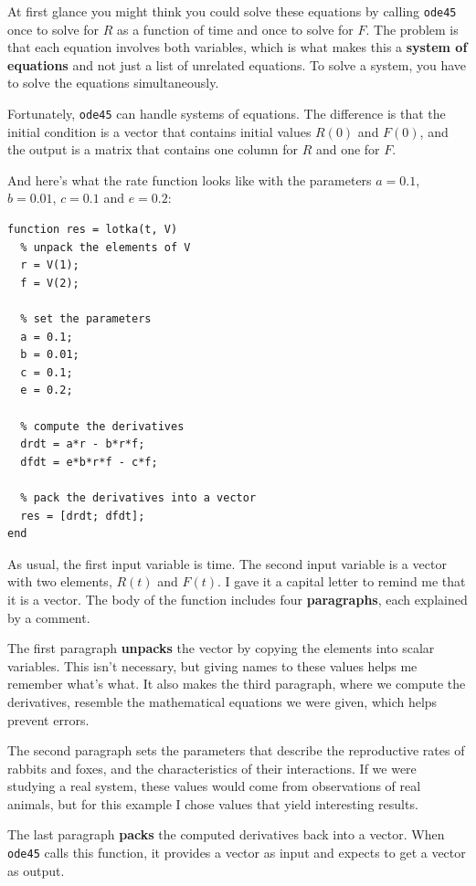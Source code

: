 \documentclass{book}
\begin{document}
At first glance you might think you could solve these equations by
calling {\tt ode45} once to solve for $R$ as a function of time and
once to solve for $F$. The problem is that each equation involves
both variables, which is what makes this a {\bf system of equations}
and not just a list of unrelated equations. To solve a system, you
have to solve the equations simultaneously.

Fortunately, {\tt ode45} can handle systems of equations. The
difference is that the initial condition is a vector that contains
initial values $R(0)$ and $F(0)$, and the output is a matrix
that contains one column for $R$ and one for $F$.

And here's what the rate function looks like
with the parameters $a = 0.1$, $b = 0.01$, $c = 0.1$ and $e = 0.2$:

\begin{verbatim}
function res = lotka(t, V)
  % unpack the elements of V
  r = V(1);
  f = V(2);

  % set the parameters
  a = 0.1;
  b = 0.01;
  c = 0.1;
  e = 0.2;
  
  % compute the derivatives
  drdt = a*r - b*r*f;
  dfdt = e*b*r*f - c*f;
  
  % pack the derivatives into a vector
  res = [drdt; dfdt];
end
\end{verbatim}

As usual, the first input variable is time.
The second input variable is a vector with two elements,
$R(t)$ and $F(t)$. I gave it a capital letter to remind me that it
is a vector. The body of the function includes four {\bf paragraphs},
each explained by a comment.

The first paragraph {\bf unpacks} the vector by copying the elements
into scalar variables. This isn't necessary, but giving names to
these values helps me remember what's what. It also makes the third
paragraph, where we compute the derivatives, resemble the mathematical
equations we were given, which helps prevent errors.

The second paragraph sets the parameters that describe the
reproductive rates of rabbits and foxes, and the characteristics of
their interactions. If we were studying a real system, these values
would come from observations of real animals, but for this example
I chose values that yield interesting results.

The last paragraph {\bf packs} the computed derivatives back into a
vector. When {\tt ode45} calls this function, it provides a vector
as input and expects to get a vector as output.
\end{document}
